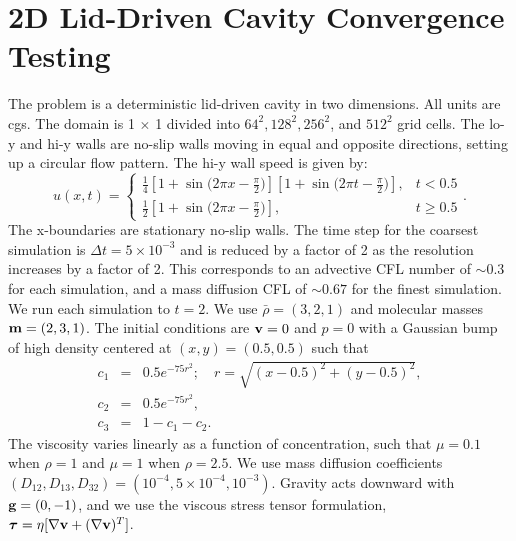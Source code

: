 \documentclass[final]{siamltex}
\def\gb {{\bf g}}
\def\mb {{\bf m}}
\def\vb {{\bf v}}
\def\taub   {\boldsymbol{\tau}}
\begin{document}
\section{2D Lid-Driven Cavity Convergence Testing}
The problem is a deterministic lid-driven cavity in two dimensions.
All units are cgs.
The domain is 1 $\times$ 1 divided into $64^2, 128^2, 256^2$, and $512^2$ grid cells.
The lo-y and hi-y walls are no-slip walls moving in equal and opposite directions,
setting up a circular flow pattern.  The hi-y wall speed is given by:
\begin{equation}
u(x,t) =
\begin{cases}
\frac{1}{4}\left[1 + \sin{(2\pi x - \frac{\pi}{2}})\right]
           \left[1 + \sin{(2\pi t - \frac{\pi}{2}})\right], & t < 0.5\\
\frac{1}{2}\left[1 + \sin{(2\pi x - \frac{\pi}{2}})\right], & t \ge 0.5
\end{cases}.
\end{equation}
The x-boundaries are stationary no-slip walls.
The time step for the coarsest simulation is $\Delta t=5\times 10^{-3}$ 
and is reduced by a factor of 2 as the resolution increases by a factor of 2.
This corresponds to an advective CFL number of $\sim 0.3$ for each simulation, and
a mass diffusion CFL of $\sim 0.67$ for the finest simulation.
We run each simulation to $t=2$.
We use $\bar\rho = (3,2,1)$ and molecular masses $\mb = (2,3,1)$.
The initial conditions are $\vb=0$ and $p=0$ with
a Gaussian bump of high density centered at $(x,y) = (0.5, 0.5)$ such that
\begin{eqnarray}
c_1 &=& 0.5e^{-75r^2}; \quad r = \sqrt{(x-0.5)^2 + (y-0.5)^2}, \\
c_2 &=& 0.5e^{-75r^2}, \\
c_3 &=& 1 - c_1 - c_2.
\end{eqnarray}
The viscosity varies linearly as a function of concentration, such that $\mu=0.1$
when $\rho=1$ and $\mu=1$ when $\rho=2.5$.  We use mass diffusion coefficients
$(D_{12},D_{13},D_{32}) = (10^{-4},5\times 10^{-4},10^{-3})$.
Gravity acts downward with $\gb=(0,-1)$, and we use
the viscous stress tensor formulation, $\taub = \eta[\nabla\vb + (\nabla\vb)^T]$.
\end{document}
